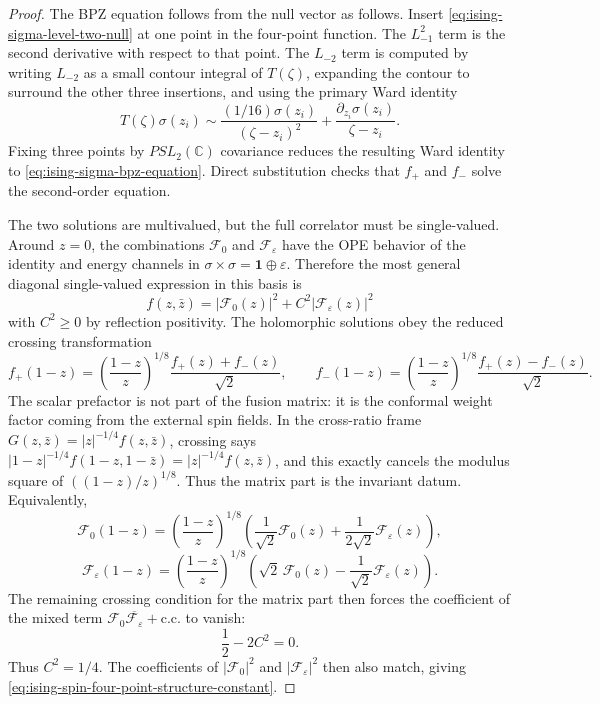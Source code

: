 \begin{proof}
The BPZ equation follows from the null vector as follows.  Insert
\eqref{eq:ising-sigma-level-two-null} at one point in the four-point
function.  The \(L_{-1}^2\) term is the second derivative with respect to
that point.  The \(L_{-2}\) term is computed by writing \(L_{-2}\) as a
small contour integral of \(T(\zeta)\), expanding the contour to surround the
other three insertions, and using the primary Ward identity
\[
  T(\zeta)\sigma(z_i)
  \sim
  \frac{(1/16)\sigma(z_i)}{(\zeta-z_i)^2}
  +
  \frac{\partial_{z_i}\sigma(z_i)}{\zeta-z_i}.
\]
Fixing three points by \(PSL_2(\mathbb C)\) covariance reduces the resulting
Ward identity to \eqref{eq:ising-sigma-bpz-equation}.  Direct substitution
checks that \(f_+\) and \(f_-\) solve the second-order equation.

The two solutions are multivalued, but the full correlator must be
single-valued.  Around \(z=0\), the combinations
\(\mathcal F_0\) and \(\mathcal F_{\varepsilon}\) have the OPE behavior of
the identity and energy channels in
\(\sigma\times\sigma=\mathbf1\oplus\varepsilon\).  Therefore the most general
diagonal single-valued expression in this basis is
\[
  f(z,\bar z)=|\mathcal F_0(z)|^2+C^2|\mathcal F_\varepsilon(z)|^2
\]
with \(C^2\ge0\) by reflection positivity.  The holomorphic solutions obey
the reduced crossing transformation
\[
  f_+(1-z)
  =
  \left(\frac{1-z}{z}\right)^{1/8}
  \frac{f_+(z)+f_-(z)}{\sqrt2},
  \qquad
  f_-(1-z)
  =
  \left(\frac{1-z}{z}\right)^{1/8}
  \frac{f_+(z)-f_-(z)}{\sqrt2}.
\]
The scalar prefactor is not part of the fusion matrix: it is the conformal
weight factor coming from the external spin fields.  In the cross-ratio frame
\(G(z,\bar z)=|z|^{-1/4}f(z,\bar z)\), crossing says
\(|1-z|^{-1/4}f(1-z,1-\bar z)=|z|^{-1/4}f(z,\bar z)\), and this exactly
cancels the modulus square of \(((1-z)/z)^{1/8}\).  Thus the matrix part is
the invariant datum.
Equivalently,
\[
  \mathcal F_0(1-z)
  =
  \left(\frac{1-z}{z}\right)^{1/8}
  \left(
  \frac1{\sqrt2}\mathcal F_0(z)
  +\frac1{2\sqrt2}\mathcal F_\varepsilon(z)
  \right),
\]
\[
  \mathcal F_\varepsilon(1-z)
  =
  \left(\frac{1-z}{z}\right)^{1/8}
  \left(
  \sqrt2\,\mathcal F_0(z)
  -\frac1{\sqrt2}\mathcal F_\varepsilon(z)
  \right).
\]
The remaining crossing condition for the matrix part then forces the
coefficient of the mixed term
\(\mathcal F_0\overline{\mathcal F_\varepsilon}+\mathrm{c.c.}\) to vanish:
\[
  \frac12-2C^2=0.
\]
Thus \(C^2=1/4\).  The coefficients of
\(|\mathcal F_0|^2\) and \(|\mathcal F_\varepsilon|^2\) then also match,
giving \eqref{eq:ising-spin-four-point-structure-constant}.
\end{proof}

